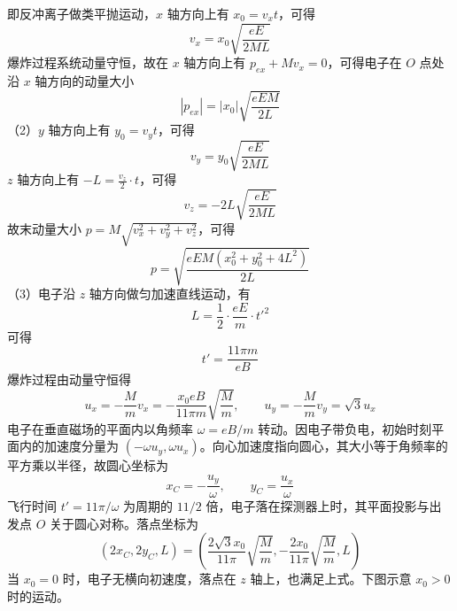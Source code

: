 \documentclass[\gkver]{gaokaozhenti}
\begin{document}
\begin{enumerate}
{即反冲离子做类平抛运动，$x$ 轴方向上有 $x_0=v_xt$，可得
\[
v_x=x_0\sqrt{\frac{eE}{2ML}}
\]
爆炸过程系统动量守恒，故在 $x$ 轴方向上有 $p_{ex}+Mv_x=0$，可得电子在 $O$ 点处沿 $x$ 轴方向的动量大小
\[
|p_{ex}|=|x_0|\sqrt{\frac{eEM}{2L}}
\]
（2）$y$ 轴方向上有 $y_0=v_yt$，可得
\[
v_y=y_0\sqrt{\frac{eE}{2ML}}
\]
$z$ 轴方向上有 $-L=\frac{v_z}{2}\cdot t$，可得
\[
v_z=-2L\sqrt{\frac{eE}{2ML}}
\]
故末动量大小 $p=M\sqrt{v_x^2+v_y^2+v_z^2}$，可得
\[
p=\sqrt{\frac{eEM(x_0^2+y_0^2+4L^2)}{2L}}
\]
（3）电子沿 $z$ 轴方向做匀加速直线运动，有
\[
L=\frac{1}{2}\cdot\frac{eE}{m}\cdot t'^2
\]
可得
\[
t'=\frac{11\pi m}{eB}
\]
爆炸过程由动量守恒得
\[
u_x=-\frac{M}{m}v_x=-\frac{x_0eB}{11\pi m}\sqrt{\frac{M}{m}},\qquad
u_y=-\frac{M}{m}v_y=\sqrt{3}u_x
\]
电子在垂直磁场的平面内以角频率 $\omega=eB/m$ 转动。因电子带负电，初始时刻平面内的加速度分量为 $(-\omega u_y,\omega u_x)$。向心加速度指向圆心，其大小等于角频率的平方乘以半径，故圆心坐标为
\[
x_C=-\frac{u_y}{\omega},\qquad y_C=\frac{u_x}{\omega}
\]
飞行时间 $t'=11\pi/\omega$ 为周期的 $11/2$ 倍，电子落在探测器上时，其平面投影与出发点 $O$ 关于圆心对称。落点坐标为
\[
(2x_C,2y_C,L)=\left(\frac{2\sqrt{3}x_0}{11\pi}\sqrt{\frac{M}{m}},-\frac{2x_0}{11\pi}\sqrt{\frac{M}{m}},L\right)
\]
当 $x_0=0$ 时，电子无横向初速度，落点在 $z$ 轴上，也满足上式。下图示意 $x_0>0$ 时的运动。
}

\end{enumerate}
\end{document}
